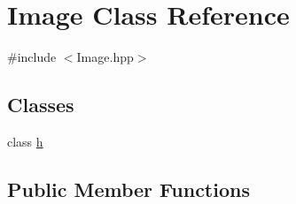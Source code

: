 \hypertarget{classImage}{
\section{Image Class Reference}
\label{classImage}
}


{\ttfamily \#include $<$Image.hpp$>$}

\subsection*{Classes}
\begin{DoxyCompactItemize}
\item 
class \hyperlink{classImage_1_1h}{h}
\end{DoxyCompactItemize}
\subsection*{Public Member Functions}
